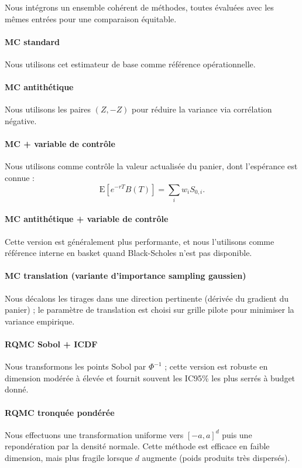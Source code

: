 ﻿\documentclass[11pt,a4paper]{article}
\begin{document}
Nous intégrons un ensemble cohérent de méthodes, toutes évaluées avec les mêmes entrées pour une comparaison équitable.

\paragraph{MC standard}
Nous utilisons cet estimateur de base comme référence opérationnelle.

\paragraph{MC antithétique}
Nous utilisons les paires $(Z,-Z)$ pour réduire la variance via corrélation négative.

\paragraph{MC + variable de contrôle}
Nous utilisons comme contrôle la valeur actualisée du panier, dont l'espérance est connue :
\begin{equation}
\mathrm{E}\left[e^{-rT}B(T)\right] = \sum_i w_i S_{0,i}.
\end{equation}

\paragraph{MC antithétique + variable de contrôle}
Cette version est généralement plus performante, et nous l'utilisons comme référence interne en basket quand Black-Scholes n'est pas disponible.

\paragraph{MC translation (variante d'importance sampling gaussien)}
Nous décalons les tirages dans une direction pertinente (dérivée du gradient du panier) ; le paramètre de translation est choisi sur grille pilote pour minimiser la variance empirique.

\paragraph{RQMC Sobol + ICDF}
Nous transformons les points Sobol par $\Phi^{-1}$ ; cette version est robuste en dimension modérée à élevée et fournit souvent les IC95\% les plus serrés à budget donné.

\paragraph{RQMC tronquée pondérée}
Nous effectuons une transformation uniforme vers $[-a,a]^d$ puis une repondération par la densité normale. Cette méthode est efficace en faible dimension, mais plus fragile lorsque $d$ augmente (poids produits très dispersés).
\end{document}
